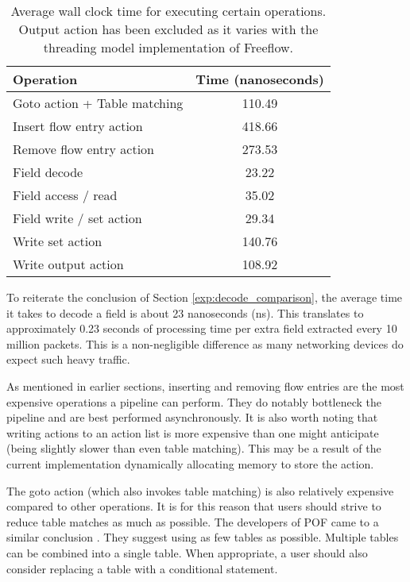 \begin{table}[ht]
\caption{Average wall clock time for executing certain operations. Output action has been excluded as it varies with the threading model implementation of Freeflow.}
\begin{center}
\begin{tabularx}{\linewidth}{| X || c | }
\hline
Operation & Time (nanoseconds)  \\
\hline
Goto action + Table matching & 110.49 \\
\hline
Insert flow entry action & 418.66 \\
\hline
Remove flow entry action & 273.53 \\
\hline
Field decode & 23.22 \\
\hline
Field access / read & 35.02 \\
\hline
Field write / set action & 29.34 \\
\hline
Write set action &  140.76 \\
\hline
Write output action & 108.92 \\
\hline
\end{tabularx}
\end{center}
\label{tbl:action_stats}
\end{table}

To reiterate the conclusion of Section \ref{exp:decode_comparison}, the average time it takes to decode a field is about 23 nanoseconds (ns). This translates to approximately 0.23 seconds of processing time per extra field extracted every 10 million packets. This is a non-negligible difference as many networking devices do expect such heavy traffic.

As mentioned in earlier sections, inserting and removing flow entries are the most expensive operations a pipeline can perform. They do notably bottleneck the pipeline and are best performed asynchronously.
It is also worth noting that writing actions to an action list is more expensive than one might anticipate (being slightly slower than even table matching). This may be a result of the current implementation dynamically allocating memory to store the action.

The goto action (which also invokes table matching) is also relatively expensive compared to other operations. It is for this reason that users should strive to reduce table matches as much as possible. The developers of POF came to a similar conclusion \cite{pof_impl}. They suggest using as few tables as possible. Multiple tables can be combined into a single table. When appropriate, a user should also consider replacing a table with a conditional statement.
